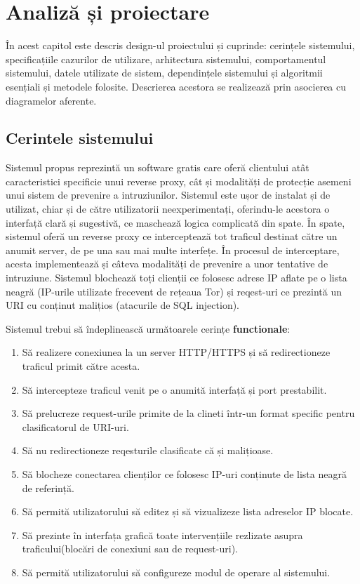 \chapter{Analiză și proiectare}
\label{cap:analiza-si-proiectare}

În acest capitol este descris design-ul proiectului și cuprinde: cerințele sistemului, specificațiile cazurilor de utilizare, arhitectura sistemului, comportamentul sistemului, datele utilizate de sistem, dependințele sistemului și algoritmii esențiali și metodele folosite. Descrierea acestora se realizează prin asocierea cu diagramelor aferente. 

\section{Cerintele sistemului}

Sistemul propus \textit{\thesistitle}  reprezintă un software gratis care oferă clientului atât caracteristici specificie unui reverse proxy, cât și modalități de protecție asemeni unui sistem de prevenire a intruziunilor. 
Sistemul este ușor de instalat și de utilizat, chiar și de către utilizatorii neexperimentați, oferindu-le acestora o interfață clară și sugestivă, ce maschează logica complicată din spate. În spate, sistemul oferă un reverse proxy ce interceptează tot traficul destinat către un anumit server, de pe una sau mai multe interfețe. În procesul de interceptare, acesta implementează și câteva modalități de prevenire a unor tentative de intruziune. Sistemul blochează toți clienții ce folosesc adrese IP aflate pe o lista neagră (IP-urile utilizate frecevent de rețeaua Tor) și reqest-uri ce prezintă un URI cu conținut malițios (atacurile de SQL injection). 

Sistemul trebui să îndeplinească următoarele cerințe  \textbf{functionale}:
\begin{enumerate}
	\item Să realizere conexiunea la un server HTTP/HTTPS și să redirectioneze traficul primit către acesta. 
	\item Să intercepteze traficul venit pe o anumită interfață și port prestabilit. 
	\item Să prelucreze request-urile primite de la clineti într-un format specific pentru clasificatorul de URI-uri. 
	\item Să nu redirectioneze reqesturile clasificate că și malițioase. 
	\item Să blocheze conectarea clienților ce folosesc IP-uri conținute de lista neagră de referință. 
	\item Să permită utilizatorului să editez și să vizualizeze lista adreselor IP blocate. 
	\item Să prezinte în interfața grafică toate intervențiile rezlizate asupra traficului(blocări de conexiuni sau de request-uri). 
	\item Să permită utilizatorului să configureze modul de operare al sistemului. 
\end{enumerate}

